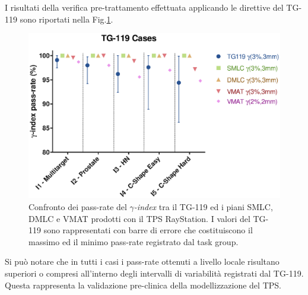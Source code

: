 I risultati della verifica pre-trattamento effettuata applicando le direttive del TG-119 sono riportati nella Fig.\ref{fig:TG_119_gamma}.
\begin{figure}
\centering
\includegraphics[width=\textwidth]{./cap2/TG119_Plots/TG_119_gamma.eps}
\caption{Confronto dei pass-rate del $\gamma$\textit{-index} tra il TG-119 ed i piani SMLC, DMLC e VMAT prodotti con il TPS RayStation. I valori del TG-119 sono rappresentati con barre di errore che costituiscono il massimo ed il minimo pass-rate registrato dal task group.}
\label{fig:TG_119_gamma}
\end{figure}
Si può notare che in tutti i casi i pass-rate ottenuti a livello locale risultano superiori o compresi all'interno degli intervalli di variabilità registrati dal TG-119. Questa rappresenta la validazione pre-clinica della modellizzazione del TPS.

